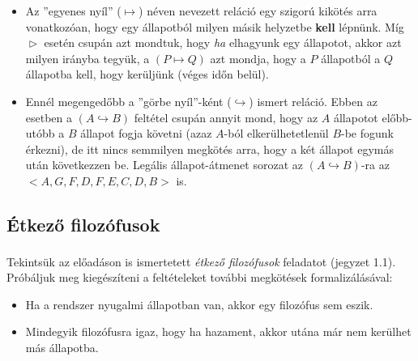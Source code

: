 \documentclass[12pt]{article}
\begin{document}
	\begin{itemize}
		\item Az ''egyenes nyíl'' ($\mapsto$) néven nevezett reláció egy szigorú kikötés arra vonatkozóan, hogy egy állapotból milyen másik helyzetbe \textbf{kell} lépnünk. Míg $\vartriangleright$ esetén csupán azt mondtuk, hogy \textit{ha} elhagyunk egy állapotot, akkor azt milyen irányba tegyük, a $(P \mapsto Q)$ azt mondja, hogy a $P$ állapotból a $Q$ állapotba kell, hogy kerüljünk (véges időn belül).
		\item Ennél megengedőbb a ''görbe nyíl''-ként ($\hookrightarrow$) ismert reláció. Ebben az esetben a $(A \hookrightarrow B)$ feltétel csupán annyit mond, hogy az $A$ állapotot előbb-utóbb a $B$ állapot fogja követni (azaz $A$-ból elkerülhetetlenül $B$-be fogunk érkezni), de itt nincs semmilyen megkötés arra, hogy a két állapot egymás után következzen be. Legális állapot-átmenet sorozat az $(A \hookrightarrow B)$-ra az $<A, G, F, D, F, E, C, D, B>$ is.
	\end{itemize}
	
	\subsection{Étkező filozófusok}\label{etkezo-filo}
	Tekintsük az előadáson is ismertetett \textit{étkező filozófusok} feladatot (jegyzet\textsuperscript{\cite{orsi_jegyzet}} 1.1). Próbáljuk meg kiegészíteni a feltételeket további megkötések formalizálásával:
	\begin{itemize}
		\item Ha a rendszer nyugalmi állapotban van, akkor egy filozófus sem eszik.
		\item Mindegyik filozófusra igaz, hogy ha hazament, akkor utána már nem kerülhet más állapotba.
	\end{itemize}
	
\end{document}
